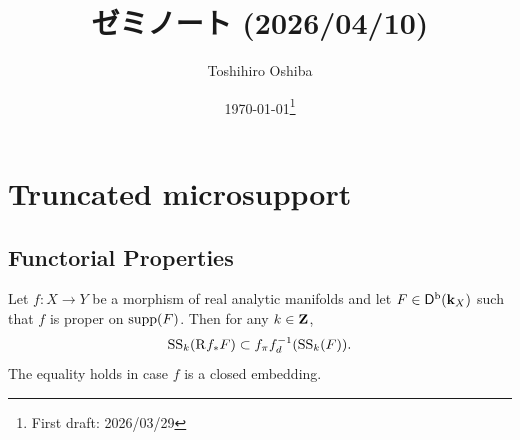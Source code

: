 \newcommand{\cotn}[1][]{\dot{T}^{\ast}{#1}}


\newcommand{\muhom}{\mu hom}
\newcommand{\muHom}[1][]{\mathrm{Hom}^\mu_{\raise1.5ex\hbox to.1em{}#1}}

\newcommand{\mucat}[2][]{\mathsf{D}^{\mathrm{b}}_{#1}(#2)}

\newcommand{\conv}[1][]{\mathbin{\mathop{\circ}\limits_{#1}}}


\newcommand{\lopen}{\mathopen{]}}
\newcommand{\lclosed}{\mathopen{[}}
\newcommand{\ropen}{\mathclose{[}}
\newcommand{\rclosed}{\mathopen{]}}

\DeclarePairedDelimiter{\openintvl}{]}{[}     %
\DeclarePairedDelimiter{\closedintvl}{[}{]}       %
\DeclarePairedDelimiter{\lopenrclosedintvl}{]}{]}    %
\DeclarePairedDelimiter{\lcosedropenintvl}{[}{[}    %


\newcommand{\sm}{\raisebox{2.33pt}{~\rule{6.4pt}{1.3pt}~}}
\newcommand{\smi}{\smallsetminus}

\newcommand{\smid}{\mathrel{;}}



\title{ゼミノート (2026/04/10)}
\author{Toshihiro Oshiba}
\date{\today\footnote{First draft: 2026/03/29}}

\maketitle
\section{Truncated microsupport}
\subsection*{Functorial Properties} 
\begin{Proposition+}
  Let \(f\colon X\to Y\) be a morphism of real analytic manifolds and let \(F\in\Dompb(\kk_X)\) such that \(f\) is proper on \(\supp(F)\). 
  Then for any \(k\in\zz\), 
  \begin{equation}\label{eq:t-push}
    \muS[k](\Rder{f_{\ast}}F)\subset
    \mpb[f]\mdiff[f]^{-1}(\muS[k](F)).
  \end{equation}
  The equality holds in case \(f\) is a closed embedding.
\end{Proposition+}

